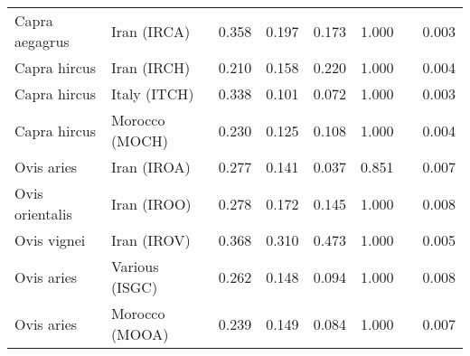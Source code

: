 \begin{center}
\begin{adjustbox}{width = 1\textwidth}
\begin{tabular}{|l|l|r|r|r|r|r|}
      Capra aegagrus &                     Iran (IRCA) &                                              0.358 &                                              0.197 &                0.173 &                                  1.000~~ &              0.003 \\
        Capra hircus &                     Iran (IRCH) &                                              0.210 &                                              0.158 &                0.220 &                                  1.000~~ &              0.004 \\
        Capra hircus &                    Italy (ITCH) &                                              0.338 &                                              0.101 &                0.072 &                                  1.000~~ &              0.003 \\
        Capra hircus &                  Morocco (MOCH) &                                              0.230 &                                              0.125 &                0.108 &                                  1.000~~ &              0.004 \\
          Ovis aries &                     Iran (IROA) &                                              0.277 &                                              0.141 &                0.037 &                                  0.851~~ &              0.007 \\
     Ovis orientalis &                     Iran (IROO) &                                              0.278 &                                              0.172 &                0.145 &                                  1.000~~ &              0.008 \\
         Ovis vignei &                     Iran (IROV) &                                              0.368 &                                              0.310 &                0.473 &                                  1.000~~ &              0.005 \\
          Ovis aries &                  Various (ISGC) &                                              0.262 &                                              0.148 &                0.094 &                                  1.000~~ &              0.008 \\
          Ovis aries &                  Morocco (MOOA) &                                              0.239 &                                              0.149 &                0.084 &                                  1.000~~ &              0.007 \\

\end{tabular}
\end{adjustbox}
\end{center}
